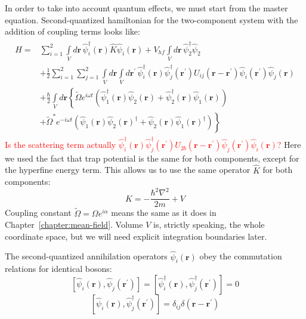 \documentclass[12pt,notitlepage]{report}
\begin{document}
In order to take into account quantum effects, we must start from the master equation.
Second-quantized hamiltonian for the two-component system with the addition of coupling terms looks like:
\begin{align}
\label{master_equation:hamiltonian}
\begin{split}
\hat{H} = {} & \sum\limits^2_{i=1}\int\limits_V d\mathbf{r} \, \hat{\psi}_i^\dagger(\mathbf{r}) \hat{K} \hat{\psi}_i(\mathbf{r}) +
	V_{hf} \int\limits_V d\mathbf{r}\, \hat{\psi}_2^\dagger \hat{\psi}_2 \\
& + \frac{1}{2} \sum\limits^2_{i=1} \sum\limits^2_{j=1} \int\limits_V d\mathbf{r} \int\limits_V d\mathbf{r}^\prime \,
	\hat{\psi}_i^\dagger (\mathbf{r}) \hat{\psi}_j^\dagger (\mathbf{r}^\prime)
	U_{ij}(\mathbf{r} - \mathbf{r}^\prime)
	\hat{\psi}_i(\mathbf{r}^\prime) \hat{\psi}_j(\mathbf{r}) \\
& + \frac{\hbar}{2} \int\limits_V d\mathbf{r} \left\{
	\tilde{\Omega} e^{i \omega t} \left(
		\hat{\psi}_1^\dagger(\mathbf{r}) \hat{\psi}_2(\mathbf{r}) +
		\hat{\psi}_2^\dagger(\mathbf{r}) \hat{\psi}_1(\mathbf{r})
	\right) \right. \\
	& \left. + \tilde{\Omega}^* e^{-i \omega t} \left(
		\hat{\psi}_1(\mathbf{r}) \hat{\psi}_2(\mathbf{r})^\dagger +
		\hat{\psi}_2(\mathbf{r}) \hat{\psi}_1(\mathbf{r})^\dagger
	\right)
\right\}
\end{split}
\end{align}
\textcolor{red}{Is the scattering term actually $\hat{\psi}_i^\dagger (\mathbf{r}) \hat{\psi}_j^\dagger (\mathbf{r}^\prime)
	U_{2b}(\mathbf{r} - \mathbf{r}^\prime)
	\hat{\psi}_j(\mathbf{r}^\prime) \hat{\psi}_i(\mathbf{r})$?}
Here we used the fact that trap potential is the same for both components, except for the hyperfine energy term.
This allows us to use the same operator $\hat{K}$ for both components:
\[ \hat{K} = - \frac{\hbar^2 \nabla^2}{2 m} + V \]
Coupling constant $\tilde{\Omega} = \Omega e^{i \alpha}$ means the same as it does in Chapter~\ref{chapter:mean-field}.
Volume $V$ is, strictly speaking, the whole coordinate space, but we will need explicit integration boundaries later.

The second-quantized annihilation operators $\hat{\psi}_i (\mathbf{r})$ obey the commutation relations for identical bosons:
\[
\left[ \hat{\psi}_i(\mathbf{r}), \hat{\psi}_j(\mathbf{r}^\prime) \right] =
\left[ \hat{\psi}_i^\dagger(\mathbf{r}), \hat{\psi}_j^\dagger(\mathbf{r}^\prime) \right] = 0
\]
\[
\left[ \hat{\psi}_i(\mathbf{r}), \hat{\psi}_j^\dagger(\mathbf{r}^\prime) \right] = \delta_{ij} \delta(\mathbf{r} - \mathbf{r}^\prime)
\]
\end{document}
